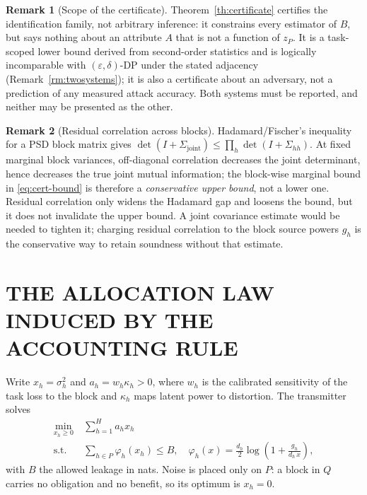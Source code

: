 \documentclass{ieeetj}
\theoremstyle{plain}
\theoremstyle{definition}
\newtheorem{remark}{Remark}
\begin{document}
\begin{remark}[Scope of the certificate]
\label{rm:scope}
Theorem~\ref{th:certificate} certifies the identification family, not
arbitrary inference: it constrains every estimator of $B$, but says nothing
about an attribute $A$ that is not a function of $z_P$. It is a task-scoped lower bound derived from second-order statistics and is
logically incomparable with $(\varepsilon,\delta)$-DP under the stated
adjacency (Remark~\ref{rm:twosystems}); it is also a certificate about an
adversary, not a prediction of any measured attack accuracy. Both systems must
be reported, and neither may be presented as the other.
\end{remark}

\begin{remark}[Residual correlation across blocks]
\label{rm:corr}
Hadamard/Fischer's inequality for a PSD block matrix gives
$\det(I+\Sigma_{\mathrm{joint}})\le\prod_h\det(I+\Sigma_{hh})$. At fixed
marginal block variances, off-diagonal correlation decreases the joint
determinant, hence decreases the true joint mutual information; the
block-wise marginal bound in \eqref{eq:cert-bound} is therefore a
\emph{conservative upper bound}, not a lower one. Residual correlation only
widens the Hadamard gap and loosens the bound, but it does not invalidate the
upper bound. A joint covariance estimate would be needed to tighten it; charging
residual correlation to the block source powers $g_h$ is the conservative way to
retain soundness without that estimate.
\end{remark}

\section{THE ALLOCATION LAW INDUCED BY THE ACCOUNTING RULE}
\label{sec:allocation}

Write $x_h=\sigma_h^{2}$ and $a_h=w_h\kappa_h>0$, where $w_h$ is the
calibrated sensitivity of the task loss to the block and $\kappa_h$ maps
latent power to distortion. The transmitter solves
\begin{equation}\begin{split}
\min_{x_h\ge0}\ &\sum_{h=1}^{H} a_h x_h\\
\text{s.t.}\ &\sum_{h\in P}\varphi_h(x_h)\le B,\quad
\varphi_h(x)=\tfrac{d_h}{2}\log\!\left(1+\frac{g_h}{d_h\,x}\right),
\end{split}\label{eq:primal}
\end{equation}
with $B$ the allowed leakage in nats. Noise is placed only on $P$: a block in
$Q$ carries no obligation and no benefit, so its optimum is $x_h=0$.
\end{document}

